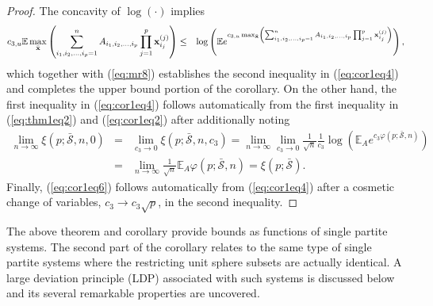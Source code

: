\documentclass[10pt]{article}
\def\x{{\bf x}}
\def\x{{\mathbf x}}
\def\x{{\bf x}}
\def\x{{\bf x}}
\def\mE{{\mathbb E}}
\def\lp{\left (}
\def\rp{\right )}
\def\x{{\bf x}}
\def\x{{\mathbf x}}
\def\x{{\bf x}}
\def\x{{\bf x}}
\def\bcS{\bar{\mathcal S}}
\begin{document}
\begin{proof}
The concavity of $\log(\cdot)$ implies
\begin{eqnarray}
\label{eq:mr17}
   c_{3,u} \mE  \max_{\bar{\x}}  \lp \sum_{i_1,i_2,\dots,i_p=1}^n A_{i_1,i_2,\dots,i_p}\prod_{j=1}^{p}\x_{i_j}^{(j)} \rp
   &\leq &
   \log \lp \mE e^{c_{3,u} \max_{\bar{\x}}  \lp \sum_{i_1,i_2,\dots,i_p=1}^n A_{i_1,i_2,\dots,i_p}\prod_{j=1}^{p}\x_{i_j}^{(j)}    \rp  }
   \rp, \nonumber \\
\end{eqnarray}
which together with (\ref{eq:mr8}) establishes the second inequality in (\ref{eq:cor1eq4}) and completes the upper bound portion of the corollary. On the other hand, the first inequality in (\ref{eq:cor1eq4}) follows automatically from the first inequality in (\ref{eq:thm1eq2}) and  (\ref{eq:cor1eq2}) after  additionally noting
\begin{eqnarray}
   \label{eq:mr18}
 \lim_{n\rightarrow \infty} \xi(p;\bcS,n,0)
 & = &
 \lim_{c_{3}\rightarrow 0}
 \xi(p;\bcS,n,c_3)  =   \lim_{n\rightarrow \infty}  \lim_{c_{3}\rightarrow 0} \frac{1}{\sqrt{n}} \frac{1}{c_3}\log \lp  \mE_A e^{c_3 \varphi(p;\bcS,n) } \rp
\nonumber \\
& = &  \lim_{n\rightarrow \infty}  \frac{1}{\sqrt{n}}   \mE_A  \varphi(p;\bcS,n) =  \xi(p;\bcS).
\end{eqnarray}
Finally, (\ref{eq:cor1eq6}) follows automatically from (\ref{eq:cor1eq4}) after a cosmetic change of variables, $c_3\rightarrow c_3\sqrt{p}$, in the second inequality.
\end{proof}


The above theorem and corollary provide bounds as functions of single partite systems. The second part of the corollary relates to the same type of single partite systems where the restricting unit sphere subsets are actually identical.   A large deviation principle (LDP) associated with such systems is discussed below and its several remarkable properties are uncovered.















\end{document}
